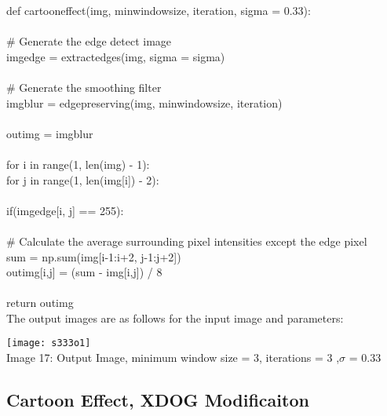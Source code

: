 \documentclass{article}
\begin{document}
	\noindent def cartoon\textunderscore effect(img, min\textunderscore window\textunderscore size, iteration, sigma = 0.33):\\
	\\
	\indent \# Generate the edge detect image\\
	\indent img\textunderscore edge = extract\textunderscore edges(img, sigma = sigma)\\
	\\
	\indent \# Generate the smoothing filter\\
	\indent img\textunderscore blur = edge\textunderscore preserving(img, min\textunderscore window\textunderscore size, iteration)\\
	\\
	\indent out\textunderscore img = img\textunderscore blur\\
	\\
	\indent for i in range(1, len(img) - 1):\\
	\indent \indent for j in range(1, len(img[i]) - 2):\\
	\\
	\indent \indent \indent if(img\textunderscore edge[i, j] == 255):\\
	\\
	\indent \indent \indent \indent \# Calculate the average surrounding pixel intensities except the edge pixel\\
	\indent \indent \indent \indent sum = np.sum(img[i-1:i+2, j-1:j+2])\\
	\indent \indent \indent \indent out\textunderscore img[i,j] = (sum - img[i,j]) / 8\\
	\\
	\indent return out\textunderscore img\\

	The output images are as follows for the input image and parameters:\\
	
	\begin{center}
		
		\texttt{[image: s333o1]}\\
		Image 17: Output Image, minimum window size = 3, iterations = 3 ,$\sigma$ = 0.33\\
		
	\end{center}
	
	\subsection{Cartoon Effect, XDOG Modificaiton}
	
\end{document}
